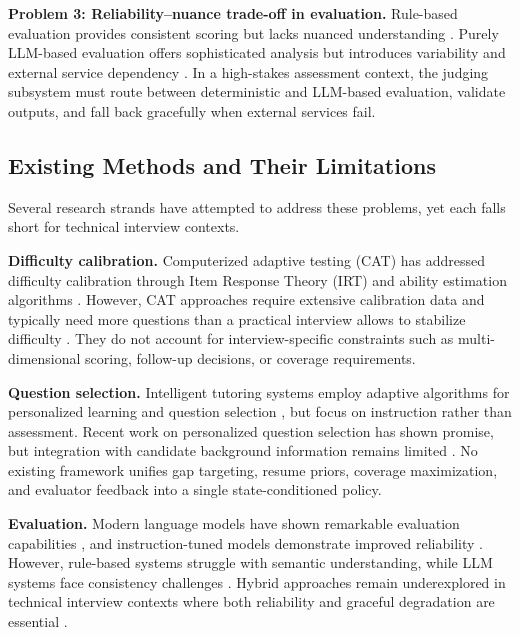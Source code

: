 ﻿\documentclass[final,3p,times,authoryear]{elsarticle}
\begin{document}
\noindent \textbf{Problem 3: Reliability--nuance trade-off in evaluation.} Rule-based evaluation provides consistent scoring but lacks nuanced understanding \cite{patel2023reliability,burrows2015eraser}. Purely LLM-based evaluation offers sophisticated analysis but introduces variability and external service dependency \cite{chang2023survey,zhang2023evaluation}. In a high-stakes assessment context, the judging subsystem must route between deterministic and LLM-based evaluation, validate outputs, and fall back gracefully when external services fail.

\subsection{Existing Methods and Their Limitations}

\noindent Several research strands have attempted to address these problems, yet each falls short for technical interview contexts.

\noindent \textbf{Difficulty calibration.} Computerized adaptive testing (CAT) has addressed difficulty calibration through Item Response Theory (IRT) and ability estimation algorithms \cite{van2006computerized,chen2021adaptive}. However, CAT approaches require extensive calibration data and typically need more questions than a practical interview allows to stabilize difficulty \cite{van2006computerized}. They do not account for interview-specific constraints such as multi-dimensional scoring, follow-up decisions, or coverage requirements.

\noindent \textbf{Question selection.} Intelligent tutoring systems employ adaptive algorithms for personalized learning and question selection \cite{vanlehn2011relative}, but focus on instruction rather than assessment. Recent work on personalized question selection \cite{chen2022personalization} has shown promise, but integration with candidate background information remains limited \cite{li2022resume}. No existing framework unifies gap targeting, resume priors, coverage maximization, and evaluator feedback into a single state-conditioned policy.

\noindent \textbf{Evaluation.} Modern language models have shown remarkable evaluation capabilities \cite{brown2020gpt3,achiam2023gpt4}, and instruction-tuned models demonstrate improved reliability \cite{ouyang2022chatgpt}. However, rule-based systems struggle with semantic understanding, while LLM systems face consistency challenges \cite{chang2023survey}. Hybrid approaches remain underexplored in technical interview contexts where both reliability and graceful degradation are essential \cite{smith2021hybrid}.
\end{document}
